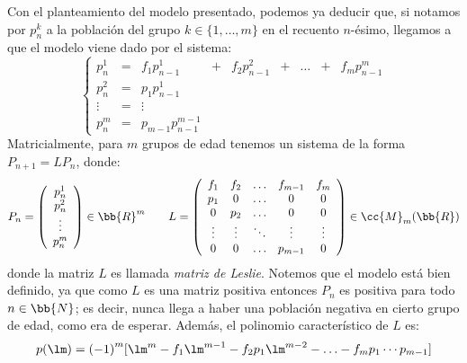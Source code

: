 Con el planteamiento del modelo presentado, podemos ya deducir que, si notamos por $p_n^k$ a la población del grupo $k\in \{1,\ldots, m\}$ en el recuento $n$-ésimo, llegamos a que el modelo viene dado por el sistema:
\begin{equation*}
    \left\{\begin{array}{ccccccccc}
        p_n^1 & = & f_1 p_{n-1}^1 & + & f_2 p_{n-1}^2 & + & \ldots & + & f_m p_{n-1}^m \\
        p_n^2 & = & p_1 p_{n-1}^1 & & & & & & \\
        \vdots & = & \vdots & & & & & & \\
        p_n^m & = & p_{m-1} p_{n-1}^{m-1} & & & & & & 
    \end{array}\right.
\end{equation*}
Matricialmente, para $m$ grupos de edad tenemos un sistema de la forma ${P_{n+1}=LP_n}$, donde:
\begin{equation*}
    P_n = \left(\begin{array}{c}
        p_n^1 \\ 
        p_n^2 \\ 
        \vdots \\
        p_n^m
    \end{array}\right)\in \bb{R}^m \qquad
    L = \left(\begin{array}{ccccc}
        f_1 & f_2 & \ldots & f_{m-1} & f_m \\
        p_1 & 0 & \ldots & 0 & 0 \\
        0 & p_2 & \ldots & 0 & 0 \\
        \vdots & \vdots & \ddots & \vdots & \vdots \\
        0 & 0 & \ldots & p_{m-1} & 0
    \end{array}\right)\in \cc{M}_m(\bb{R})
\end{equation*}
donde la matriz $L$ es llamada \emph{matriz de Leslie}. Notemos que el modelo está bien definido, ya que como $L$ es una matriz positiva entonces $P_n$ es positiva para todo $n\in \bb{N}$; es decir, nunca llega a haber una población negativa en cierto grupo de edad, como era de esperar.
Además, el polinomio característico de $L$ es:
\begin{equation*}
    p(\lm) = {(-1)}^m [\lm^m - f_1\lm^{m-1} - f_2p_1\lm^{m-2} - \ldots - f_mp_1 \cdots p_{m-1}]
\end{equation*}
